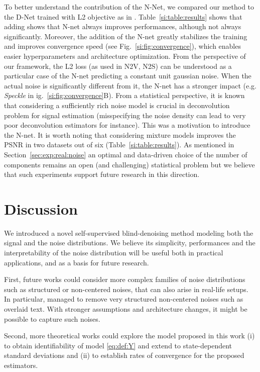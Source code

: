 \documentclass{article}
\begin{document}
To better understand the contribution of the N-Net, we compared our method to the D-Net trained with L2 objective as in \cite{batson2019noise2self, krull2018noise2void}. Table~\ref{si:table:results} shows that adding shows that N-net always improves performances, although not always significantly. Moreover, the addition of the N-net greatly stabilizes the training and improves convergence speed (see Fig.~\ref{si:fig:convergence}), which enables easier hyperparameters and architecture optimization.
From the perspective of our framework, the L2 loss (as used in N2V, N2S) can be understood as a particular case of the N-net predicting a constant unit gaussian noise. When the actual noise is significantly different from it, the N-net has a stronger impact (e.g. \textit{Speckle} in ig.~\ref{si:fig:convergence}B).
From a statistical perspective, it is known that considering a sufficiently rich noise model is crucial in deconvolution problem for signal estimation (misspecifying the noise density can lead to very poor deconvolution estimators for instance). This was a motivation to introduce the N-net.
It is worth noting that considering mixture models improves the PSNR in two datasets out of six (Table~\ref{si:table:results}).
As mentioned in Section~\ref{sec:exp:real:noise} an optimal and data-driven choice of the number of components remains an open (and challenging) statistical problem but we believe that such experiments support future research in this direction.

\section{Discussion}
\label{sec:discussion}
We introduced a novel self-supervised blind-denoising method modeling both the signal and the noise distributions. We believe its simplicity, performances and the interpretability of the noise distribution will be useful both in practical applications, and as a basis for future research.

First, future works could consider more complex families of noise distributions such as structured or non-centered noises, that can also arise in real-life setups. In particular, \cite{lehtinen2018noise2noise} managed to remove very structured non-centered noises such as overlaid text. With stronger assumptions and architecture changes, it might be possible to capture such noises.

Second, more theoretical works could explore the model proposed in this work  (i) to obtain identifiability of model \eqref{eq:def:Y} and extend \cite{gassiat:lecorff:lehericy:2021} to state-dependent standard deviations and (ii) to establish rates of convergence for the proposed estimators.
\end{document}
